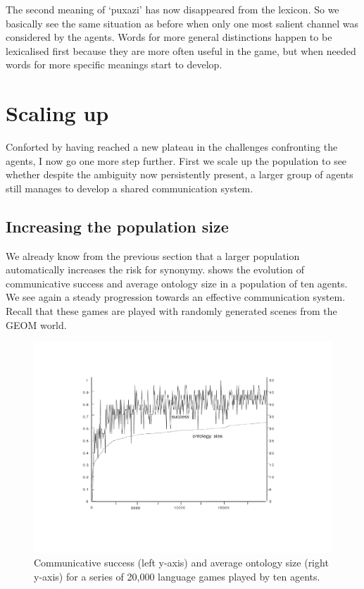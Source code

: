 The second meaning of `puxazi' has now disappeared
from the lexicon. So we basically see the same situation 
as before when only one most salient channel was
considered by the agents. Words for more general distinctions
happen to be lexicalised first because they are more 
often useful in the game, but when needed words for more specific
meanings start to develop. 

\section{Scaling up}

Conforted by having reached a new plateau in 
the challenges confronting the agents, I now go 
one more step further. First we scale up the 
population to see whether despite the ambiguity
now persistently present, a larger group of 
agents still manages to develop a shared
communication system. 

\subsection{Increasing the population size}

We already know from the previous section that 
a larger population automatically increases
the risk for synonymy.  shows the 
evolution of communicative success and average
ontology size in a population
of ten agents. We see again a steady progression
towards an effective communication system. Recall that 
these games are played with randomly generated scenes
from the GEOM world. 


\begin{figure}[htbp]
  \centerline{\includegraphics[width=.80\textwidth]{chap6/figs/agnt10}}
\caption{\label{agnt10} Communicative 
success (left y-axis) and average ontology size 
(right y-axis) for a series of 20,000 
language games played by ten agents.} 
\end{figure}

